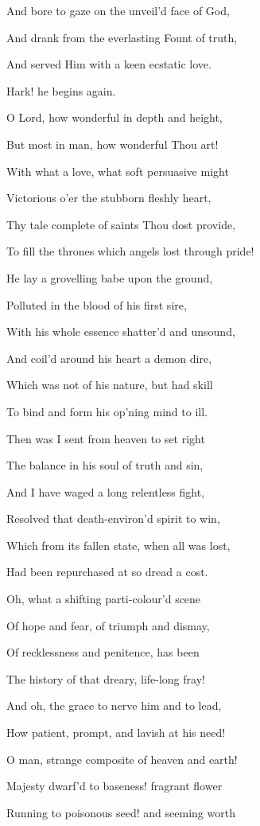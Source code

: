 And bore to gaze on the unveil'd face of God,

And drank from the everlasting Fount of truth,

And served Him with a keen ecstatic love.

Hark! he begins again.


O Lord, how wonderful in depth and height,

But most in man, how wonderful
Thou art!

With what a love, what soft persuasive might

Victorious o'er the stubborn
fleshly heart,

Thy tale complete of saints Thou dost provide,

To fill the thrones which angels lost through
pride!

He lay a grovelling babe upon the ground,

Polluted in the blood of his
first sire,

With his whole essence shatter'd and unsound,

And coil'd around his heart a
demon dire,

Which was not of his nature, but had skill

To bind and form his op'ning mind to ill. 

Then was I sent from heaven to set right

The balance in his soul of
truth and sin,

And I have waged a long relentless fight,

Resolved that death-environ'd
spirit to win,

Which from its fallen state, when all was lost,

Had been repurchased at so dread a cost.

Oh, what a shifting parti-colour'd scene

Of hope and fear, of triumph
and dismay,

Of recklessness and penitence, has been

The history of that dreary,
life-long fray!

And oh, the grace to nerve him and to lead,

How patient, prompt, and lavish at his need!

O man, strange composite of heaven and earth!

Majesty dwarf'd to baseness!
fragrant flower

Running to poisonous seed! and seeming worth

